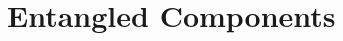 \documentclass[journal]{IEEEtran}
\begin{document}



\section{Entangled Components}
\label{entangled}



\end{document}

